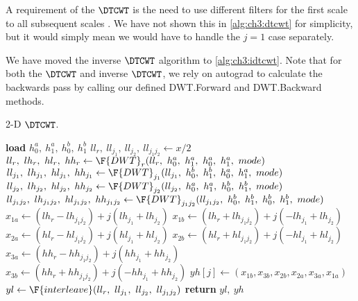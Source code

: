 A requirement of the $\DTCWT$ is the need to use different filters for the first
scale to all subsequent scales \cite{selesnick_dual-tree_2005}. We have not
shown this in \autoref{alg:ch3:dtcwt} for simplicity, but it would simply mean
we would have to handle the $j=1$ case separately.

We have moved the inverse $\DTCWT$ algorithm to \autoref{alg:ch3:idtcwt}. Note
that for both the $\DTCWT$ and inverse $\DTCWT$, we rely on autograd to
calculate the backwards pass by calling our defined DWT.Forward and 
DWT.Backward methods.

\begin{algorithm}[t]
\caption{2-D $\DTCWT$. }\label{alg:ch3:dtcwt}
\begin{algorithmic}[1]
\State \textbf{load} $h_0^a,\ h_1^a,\ h_0^b,\ h_1^b$ 
\State $ll_{r},\ ll_{j_1},\ ll_{j_2},\ ll_{j_1j_2} \gets x/2$
\State $ll_{r},\ lh_{r},\ hl_{r},\ hh_{r} \gets \F{DWT}_{r}(ll_{r},\ h_0^a,\ h_1^a,\ h_0^a,\ h_1^a,\ mode)$
\State $ll_{j_1},\ lh_{j_1},\ hl_{j_1},\ hh_{j_1} \gets \F{DWT}_{j_1}(ll_{j_1},\ h_0^b,\ h_1^b,\ h_0^a,\ h_1^a,\ mode)$
\State $ll_{j_2},\ lh_{j_2},\ hl_{j_2},\ hh_{j_2} \gets \F{DWT}_{j_2}(ll_{j_2},\ h_0^a,\ h_1^a,\ h_0^b,\ h_1^b,\ mode)$
\State $ll_{j_1j_2},\ lh_{j_1j_2},\ hl_{j_1j_2},\ hh_{j_1j_2} \gets \F{DWT}_{j_1j_2}(ll_{j_1j_2},\ h_0^b,\ h_1^b,\ h_0^b,\ h_1^b,\ mode)$
  \State $x_{1a} \gets (lh_{r} - lh_{j_1j_2}) + j(lh_{j_1} + lh_{j_2}) $ 
  \State $x_{1b} \gets (lh_{r} + lh_{j_1j_2}) + j(-lh_{j_1} + lh_{j_2}) $ 
  \State $x_{2a} \gets (hl_{r} - hl_{j_1j_2}) + j(hl_{j_1} + hl_{j_2}) $ 
  \State $x_{2b} \gets (hl_{r} + hl_{j_1j_2}) + j(-hl_{j_1} + hl_{j_2}) $ 
  \State $x_{3a} \gets (hh_{r} - hh_{j_1j_2}) + j(hh_{j_1} + hh_{j_2}) $ 
  \State $x_{3b} \gets (hh_{r} + hh_{j_1j_2}) + j(-hh_{j_1} + hh_{j_2}) $ 
  \State $yh[j] \gets (x_{1b},x_{3b}, x_{2b}, x_{2a}, x_{3a}, x_{1a}) $
\EndFor
\State $yl \gets \F{interleave}(ll_{r},\ ll_{j_1},\ ll_{j_2},\ ll_{j_1j_2})$
\State \textbf{return} $yl,\ yh$
\EndFunction
\end{algorithmic}
\end{algorithm}

